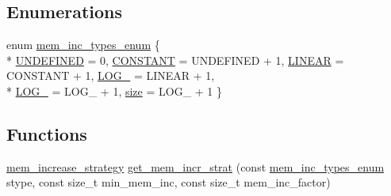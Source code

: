 \subsection*{Enumerations}
\begin{DoxyCompactItemize}
\item 
enum \hyperlink{namespaceuva_1_1utils_1_1containers_a2dfd5027e0c656e7b8433760967da62d}{mem\+\_\+inc\+\_\+types\+\_\+enum} \{ \\*
\hyperlink{namespaceuva_1_1utils_1_1containers_a2dfd5027e0c656e7b8433760967da62da378c848dc111a9fb0be352f3e73caaf5}{U\+N\+D\+E\+F\+I\+N\+E\+D} = 0, 
\hyperlink{namespaceuva_1_1utils_1_1containers_a2dfd5027e0c656e7b8433760967da62da2e97241bf53f5da01ef85f408863370d}{C\+O\+N\+S\+T\+A\+N\+T} = U\+N\+D\+E\+F\+I\+N\+E\+D + 1, 
\hyperlink{namespaceuva_1_1utils_1_1containers_a2dfd5027e0c656e7b8433760967da62daef7537589dc0f411a7215b5904b21073}{L\+I\+N\+E\+A\+R} = C\+O\+N\+S\+T\+A\+N\+T + 1, 
\hyperlink{namespaceuva_1_1utils_1_1containers_a2dfd5027e0c656e7b8433760967da62da8ca02671080014d040d3d1c7db41b447}{L\+O\+G\+\_} = L\+I\+N\+E\+A\+R + 1, 
\\*
\hyperlink{namespaceuva_1_1utils_1_1containers_a2dfd5027e0c656e7b8433760967da62daa0517306d9991f24d02b23c2df9ac368}{L\+O\+G\+\_} = L\+O\+G\+\_ + 1, 
\hyperlink{namespaceuva_1_1utils_1_1containers_a2dfd5027e0c656e7b8433760967da62da0be5bdf7cf8c7c58d0bc5678caa07791}{size} = L\+O\+G\+\_ + 1
 \}
\end{DoxyCompactItemize}
\subsection*{Functions}
\begin{DoxyCompactItemize}
\item 
\hyperlink{classuva_1_1utils_1_1containers_1_1mem__increase__strategy}{mem\+\_\+increase\+\_\+strategy} \hyperlink{namespaceuva_1_1utils_1_1containers_a04ae8ecdaffa42ace76f1c604659ba6c}{get\+\_\+mem\+\_\+incr\+\_\+strat} (const \hyperlink{namespaceuva_1_1utils_1_1containers_a2dfd5027e0c656e7b8433760967da62d}{mem\+\_\+inc\+\_\+types\+\_\+enum} stype, const size\+\_\+t min\+\_\+mem\+\_\+inc, const size\+\_\+t mem\+\_\+inc\+\_\+factor)
\end{DoxyCompactItemize}
